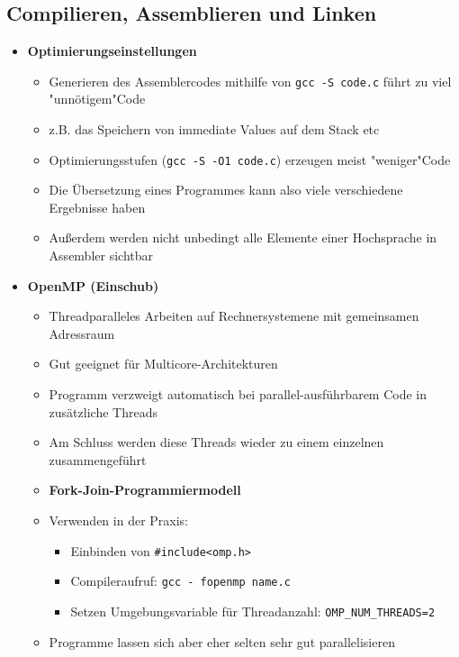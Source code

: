 \pagebreak

\subsection{Compilieren, Assemblieren und Linken}
    \begin{itemize}
        \item \textbf{Optimierungseinstellungen}
            \begin{itemize}
                \item Generieren des Assemblercodes mithilfe von \texttt{gcc -S code.c} führt zu viel \string"unnötigem"\string Code
                \item z.B. das Speichern von immediate Values auf dem Stack etc
                \item Optimierungsstufen (\texttt{gcc -S -O1 code.c}) erzeugen meist \string"weniger"\string Code
                \item Die Übersetzung eines Programmes kann also viele verschiedene Ergebnisse haben
                \item Außerdem werden nicht unbedingt alle Elemente einer Hochsprache in Assembler sichtbar
            \end{itemize}

        \item \textbf{OpenMP (Einschub)}
            \begin{itemize}
                \item Threadparalleles Arbeiten auf Rechnersystemene mit gemeinsamen Adressraum
                \item Gut geeignet für Multicore-Architekturen
                \item Programm verzweigt automatisch bei parallel-ausführbarem Code in zusätzliche Threads
                \item Am Schluss werden diese Threads wieder zu einem einzelnen zusammengeführt
                \item \textbf{Fork-Join-Programmiermodell}
                \item Verwenden in der Praxis:
                    \begin{itemize}
                        \item Einbinden von \texttt{\#include<omp.h>}
                        \item Compileraufruf: \texttt{gcc - fopenmp name.c}
                        \item Setzen Umgebungsvariable für Threadanzahl: \texttt{OMP\_NUM\_THREADS=2}
                    \end{itemize}
                \item Programme lassen sich aber eher selten sehr gut parallelisieren
            \end{itemize}


\end{itemize}
